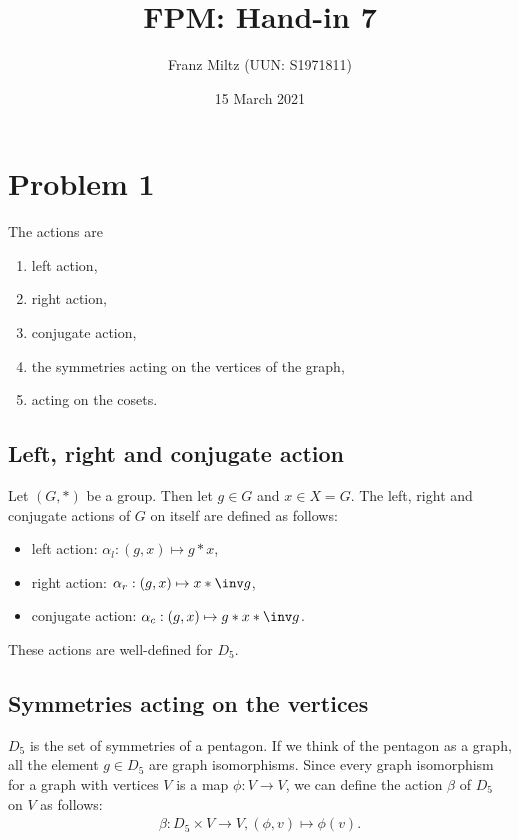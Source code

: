 \documentclass{article}
\begin{document}
\title{FPM: Hand-in 7}
\author{Franz Miltz (UUN: S1971811)}
\date{15 March 2021}
\maketitle
\mkthms
\section*{Problem 1}

The actions are
\begin{enumerate}
	\item left action,
	\item right action,
	\item conjugate action,
	\item the symmetries acting on the vertices of the graph,
	\item acting on the cosets.
\end{enumerate}

\subsection*{Left, right and conjugate action}

Let $(G, *)$ be a group. Then let $g\in G$ and $x\in X = G$.
The left, right and conjugate actions of $G$ on itself are defined as follows:

\begin{itemize}
	\item left action: $\alpha_l: (g,x) \mapsto g * x$,
	\item right action: $\alpha_r: (g,x) \mapsto x * \inv g$,
	\item conjugate action: $\alpha_c: (g,x) \mapsto g * x * \inv g$.
\end{itemize}

\noindent These actions are well-defined for $D_5$.

\subsection*{Symmetries acting on the vertices}

$D_5$ is the set of symmetries of a pentagon. If we think of the pentagon as
a graph, all the element $g\in D_5$ are graph isomorphisms. Since every
graph isomorphism for a graph with vertices $V$ is a map $\phi:V\to V$,
we can define the action $\beta$ of $D_5$ on $V$ as follows:
\begin{align*}
	\beta: D_5\times V\to V,(\phi, v)\mapsto \phi(v).
\end{align*}
\end{document}
